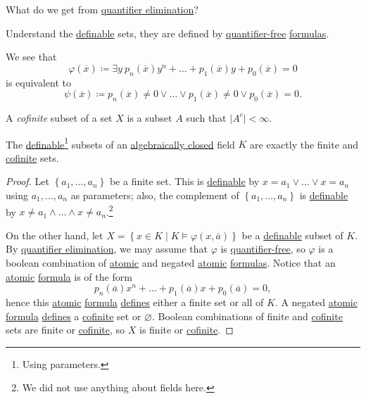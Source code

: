 \begin{problem}
What do we get from \hyperref[def:quantifier-elimination]{quantifier elimination}?
\end{problem}
\begin{answer}
	Understand the \hyperref[def:definable]{definable} sets, they are defined by \hyperref[not:quantifier-free]{quantifier-free} \hyperref[def:formula]{formulas}.
\end{answer}

\begin{remark}
	We see that
	\[
		\varphi (\overline{x} ) \coloneqq \exists y\ p_n(\overline{x} ) y^n + \ldots + p_1(\overline{x} )y + p_0(\overline{x} ) = 0
	\]
	is equivalent to
	\[
		\psi (\overline{x} ) \coloneqq p_n(\overline{x} ) \neq 0 \lor \ldots \lor p_1(\overline{x} ) \neq 0 \lor p_0(\overline{x} ) = 0.
	\]
\end{remark}

\begin{definition}[Cofinite]\label{def:cofinite}
	A \emph{cofinite} subset of a set \(X\) is a subset \(A\) such that \(\vert A^{c} \vert < \infty \).
\end{definition}

\begin{proposition}\label{prop:lec18}
	The \hyperref[def:definable]{definable}\footnote{Using parameters.} subsets of an \hyperref[def:algebraically-closed]{algebraically closed} field \(K\) are exactly the finite and \hyperref[def:cofinite]{cofinite} sets.
\end{proposition}
\begin{proof}
	Let \(\left\{ a_1, \ldots , a_n \right\} \) be a finite set. This is \hyperref[def:definable]{definable} by \(x=a_1 \lor \ldots \lor x=a_n\) using \(a_1, \ldots , a_n\) as parameters; also, the complement of \(\left\{ a_1, \ldots , a_n  \right\} \) is \hyperref[def:definable]{definable} by \(x \neq a_1 \land \ldots \land x\neq a_n\).\footnote{We did not use anything about fields here.}

	On the other hand, let \(X=\left\{ x\in K \mid K \models \varphi (x, \overline{a} ) \right\} \) be a \hyperref[def:definable]{definable} subset of \(K\). By \hyperref[def:quantifier-elimination]{quantifier elimination}, we may assume that \(\varphi \) is \hyperref[not:quantifier-free]{quantifier-free}, so \(\varphi \) is a boolean combination of \hyperref[not:atomic]{atomic} and negated \hyperref[not:atomic]{atomic} \hyperref[def:formula]{formulas}. Notice that an \hyperref[not:atomic]{atomic} \hyperref[def:formula]{formula} is of the form
	\[
		p_n(\overline{a} ) x^n + \ldots + p_1(\overline{a} ) x + p_0(\overline{a} ) = 0,
	\]
	hence this \hyperref[not:atomic]{atomic} \hyperref[def:formula]{formula} \hyperref[def:definable]{defines} either a finite set or all of \(K\). A negated \hyperref[not:atomic]{atomic} \hyperref[def:formula]{formula} \hyperref[def:definable]{defines} a \hyperref[def:cofinite]{cofinite} set or \(\varnothing \). Boolean combinations of finite and \hyperref[def:cofinite]{cofinite} sets are finite or \hyperref[def:cofinite]{cofinite}, so \(X\) is finite or \hyperref[def:cofinite]{cofinite}.
\end{proof}

